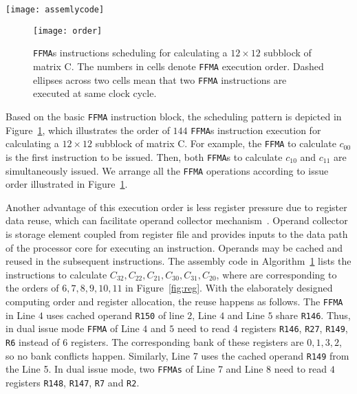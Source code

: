 \begin{figure*}[htbp]
\begin{center}
\texttt{[image: assemlycode]}
    \caption{The comparison of compiler generated codes and our tuned assembly codes.}
\label{fig:assemblycode}
\end{center}
\end{figure*}

\begin{figure}[htbp]
\begin{center}
\texttt{[image: order]}
\caption{{\tt FFMA}s instructions scheduling for calculating a $12\times 12$ subblock of matrix C.  The numbers in cells denote {\tt FFMA} execution order. Dashed ellipses across two cells mean that two {\tt FFMA} instructions are executed at same clock cycle.}
\label{fig:order}
\end{center}
\end{figure}

Based on the basic {\tt FFMA} instruction block, the scheduling pattern is depicted in Figure~\ref{fig:order}, which
illustrates the order of $144$ {\tt FFMA}s instruction execution for calculating a $12\times 12$ subblock of matrix C.
For example, the {\tt FFMA} to calculate $c_{00}$ is the first instruction to be issued. Then, both {\tt FFMA}s to
calculate $c_{10}$ and  $c_{11}$ are simultaneously issued. We arrange all the {\tt FFMA} operations according to issue
order illustrated in Figure~\ref{fig:order}.

Another advantage of this execution order is less register pressure due to register data reuse, which can facilitate
operand collector mechanism~\cite{collector}. Operand collector is storage element coupled from register file and
provides inputs to the data path of the processor core for executing an instruction. Operands may be cached and reused
in the subsequent instructions. The assembly code in Algorithm~\ref{fig:order} lists the instructions to calculate
$C_{32},C_{22}, C_{21}, C_{30}, C_{31}, C_{20}$, where are corresponding to the orders of $6,7,8,9,10,11$ in
Figure~\ref{fig:reg}. With the elaborately designed computing order and register allocation, the reuse happens as follows. The {\tt FFMA} in Line $4$ uses cached operand {\tt R150} of line $2$, Line $4$ and Line $5$ share {\tt R146}. Thus, in dual issue mode {\tt FFMA} of Line $4$ and $5$ need to read 4 registers {\tt R146}, {\tt R27}, {\tt R149}, {\tt R6} instead of $6$ registers. The corresponding bank of these registers are $0,1,3,2$, so no bank conflicts happen.
Similarly, Line 7 uses the cached operand {\tt R149} from the Line 5. In dual issue mode, two {\tt FFMAs} of Line 7 and Line 8 need to read $4$ registers {\tt R148}, {\tt R147}, {\tt R7} and {\tt R2}.

